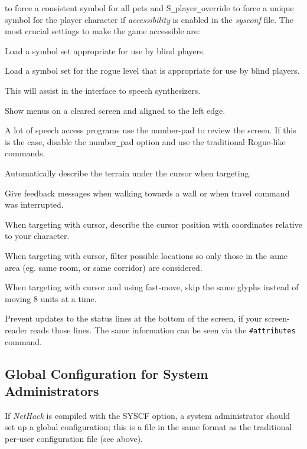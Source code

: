 to force a consistent symbol for all pets and S\verb+_+player\verb+_+override
to force a unique symbol for the player character if {\it accessibility\/}
is enabled in the {\it sysconf\/} file.
The most crucial settings to make the game accessible are:
\blist{}
\item[\ib{symset:NHAccess}]
Load a symbol set appropriate for use by blind players.
\item[\ib{roguesymset:NHAccess}]
Load a symbol set for the rogue level that is appropriate for
use by blind players.
\item[\ib{menustyle:traditional}]
This will assist in the interface to speech synthesizers.
\item[\ib{nomenu\verb+_+overlay}]
Show menus on a cleared screen and aligned to the left edge.
\item[\ib{number\verb+_+pad}]
A lot of speech access programs use the number-pad to review the screen.
If this is the case, disable the number\verb+_+pad option and use the
traditional Rogue-like commands.
\item[\ib{autodescribe}]
Automatically describe the terrain under the cursor when targeting.
\item[\ib{mention\verb+_+walls}]
Give feedback messages when walking towards a wall or when travel command
was interrupted.
\item[\ib{whatis\verb+_+coord:compass}]
When targeting with cursor, describe the cursor position with coordinates
relative to your character.
\item[\ib{whatis\verb+_+filter:area}]
When targeting with cursor, filter possible locations so only those in
the same area (eg. same room, or same corridor) are considered.
\item[\ib{whatis\verb+_+moveskip}]
When targeting with cursor and using fast-move, skip the same glyphs instead
of moving 8 units at a time.
\item[\ib{nostatus\verb+_+updates}]
Prevent updates to the status lines at the bottom of the screen, if
your screen-reader reads those lines. The same information can be
seen via the {\tt \#attributes} command.
\elist

\subsection*{Global Configuration for System Administrators}

If {\it NetHack\/} is compiled with the SYSCF option, a system administrator
should set up a global configuration; this is a file in the
same format as the traditional per-user configuration file (see above).

